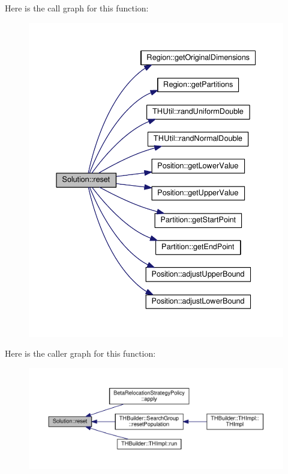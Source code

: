 Here is the call graph for this function\+:\nopagebreak
\begin{figure}[H]
\begin{center}
\leavevmode
\includegraphics[width=350pt]{classSolution_a84c713b707a570add53e85a28196bb3e_cgraph}
\end{center}
\end{figure}




Here is the caller graph for this function\+:\nopagebreak
\begin{figure}[H]
\begin{center}
\leavevmode
\includegraphics[width=350pt]{classSolution_a84c713b707a570add53e85a28196bb3e_icgraph}
\end{center}
\end{figure}


